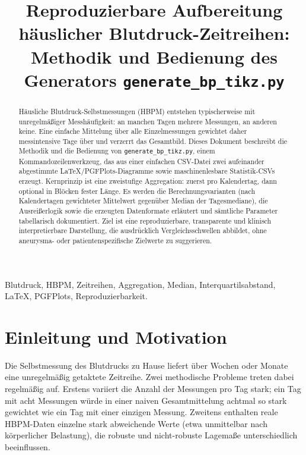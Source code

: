 \documentclass[conference]{IEEEtran}
\begin{document}
\title{Reproduzierbare Aufbereitung häuslicher Blutdruck-Zeitreihen:\\
Methodik und Bedienung des Generators \texttt{generate\_bp\_tikz.py}}

\author{%
}

\maketitle

\begin{abstract}
Häusliche Blutdruck-Selbstmessungen (HBPM) entstehen typischerweise mit
unregelmäßiger Messhäufigkeit: an manchen Tagen mehrere Messungen, an anderen
keine. Eine einfache Mittelung über alle Einzelmessungen gewichtet daher
mess\-intensive Tage über und verzerrt das Gesamtbild. Dieses Dokument
beschreibt die Methodik und die Bedienung von \texttt{generate\_bp\_tikz.py},
einem Kommandozeilenwerkzeug, das aus einer einfachen CSV-Datei zwei
aufeinander abgestimmte LaTeX/PGFPlots-Diagramme sowie maschinenlesbare
Statistik-CSVs erzeugt. Kernprinzip ist eine zweistufige Aggregation: zuerst
pro Kalendertag, dann optional in Blöcken fester Länge. Es werden die
Berechnungsvarianten (nach Kalendertagen gewichteter Mittelwert gegenüber
Median der Tagesmediane), die Ausreißerlogik sowie die erzeugten Datenformate
erläutert und sämtliche Parameter tabellarisch dokumentiert. Ziel ist eine
reproduzierbare, transparente und klinisch interpretierbare Darstellung, die
ausdrücklich Vergleichsschwellen abbildet, ohne aneurysma- oder
patientenspezifische Zielwerte zu suggerieren.
\end{abstract}

\begin{IEEEkeywords}
Blutdruck, HBPM, Zeitreihen, Aggregation, Median, Interquartilsabstand,
LaTeX, PGFPlots, Reproduzierbarkeit.
\end{IEEEkeywords}

\section{Einleitung und Motivation}
Die Selbstmessung des Blutdrucks zu Hause liefert über Wochen oder Monate eine
unregelmäßig getaktete Zeitreihe. Zwei methodische Probleme treten dabei
regelmäßig auf. Erstens variiert die Anzahl der Messungen pro Tag stark; ein
Tag mit acht Messungen würde in einer naiven Gesamtmittelung achtmal so stark
gewichtet wie ein Tag mit einer einzigen Messung. Zweitens enthalten reale
HBPM-Daten einzelne stark abweichende Werte (etwa unmittelbar nach körperlicher
Belastung), die robuste und nicht-robuste Lagemaße unterschiedlich beeinflussen.
\end{document}
